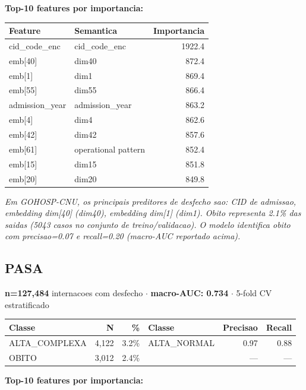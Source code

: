 \documentclass[11pt,a4paper]{article}
\begin{document}
\vspace{4pt}\noindent\textbf{Top-10 features por importancia:}

\begin{tabular}{llr}
\toprule
Feature & Semantica & Importancia \\
\midrule
cid\_code\_enc & cid\_code\_enc & 1922.4 \\
emb[40] & dim40 & 872.4 \\
emb[1] & dim1 & 869.4 \\
emb[55] & dim55 & 866.4 \\
admission\_year & admission\_year & 863.2 \\
emb[4] & dim4 & 862.6 \\
emb[42] & dim42 & 857.6 \\
emb[61] & operational pattern & 852.4 \\
emb[15] & dim15 & 851.8 \\
emb[20] & dim20 & 849.8 \\
\bottomrule
\end{tabular}

\vspace{4pt}\noindent\textit{Em GOHOSP-CNU, os principais preditores de desfecho sao: CID de admissao, embedding dim[40] (dim40), embedding dim[1] (dim1). Obito representa 2.1\% das saidas (5043 casos no conjunto de treino/validacao). O modelo identifica obito com precisao=0.07 e recall=0.20 (macro-AUC reportado acima).}

\subsection{PASA}
\textbf{n=127,484} internacoes com desfecho $\cdot$ \textbf{macro-AUC: 0.734} $\cdot$ 5-fold CV estratificado

\begin{tabular}{lrr|lrr}
\toprule
Classe & N & \% & Classe & Precisao & Recall \\
\midrule
ALTA\_COMPLEXA & 4,122 & 3.2\% & ALTA\_NORMAL & 0.97 & 0.88 \\
OBITO & 3,012 & 2.4\% &  & --- & --- \\
\bottomrule
\end{tabular}

\vspace{4pt}\noindent\textbf{Top-10 features por importancia:}
\end{document}

